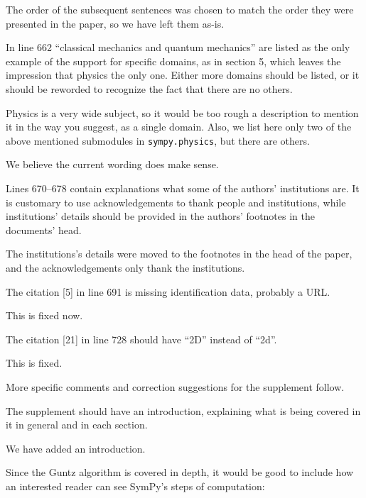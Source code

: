 \documentclass[answers,12pt]{exam}
\begin{document}
\begin{questions}
\begin{solution}
The order of the subsequent sentences was chosen to match the order they were
presented in the paper, so we have left them as-is.
\end{solution}

\question In line 662 ``classical mechanics and quantum mechanics'' are listed as the only example of the support for specific domains, as in section 5, which leaves the impression that physics the only one. Either more domains should be listed, or it should be reworded to recognize the fact that there are no others.
\begin{solution}
Physics is a very wide subject, so it would be too rough a description to mention
it in the way you suggest, as a single domain.  Also, we list here only two of
the above mentioned
submodules in \texttt{sympy.physics}, but there are others.

We believe the current wording does make sense.
\end{solution}

\question Lines 670--678 contain explanations what some of the authors' institutions are. It is customary to use acknowledgements to thank people and institutions, while institutions' details should be provided in the authors' footnotes in the documents' head.
\begin{solution}
The institutions's details were moved to the footnotes in the head of the
paper, and the acknowledgements only thank the institutions.
\end{solution}

\question The citation [5] in line 691 is missing identification data, probably a URL\@.
\begin{solution}
This is fixed now.
\end{solution}

\question The citation [21] in line 728 should have ``2D'' instead of ``2d''.
\begin{solution}
This is fixed.
\end{solution}

More specific comments and correction suggestions for the supplement follow.

\question The supplement should have an introduction, explaining what is being covered in it in general and in each section.
\begin{solution}
We have added an introduction.
\end{solution}

\question Since the Guntz algorithm is covered in depth, it would be good to
include how an interested reader can see SymPy's steps of computation:


\end{questions}
\end{document}
